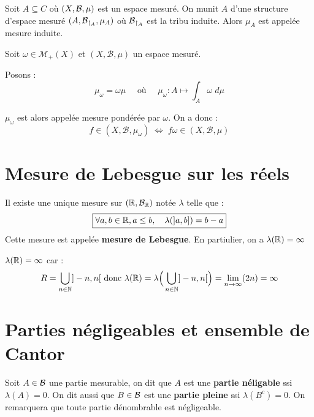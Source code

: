 \begin{definition}
    Soit $A \subseteq C$ où $(X,\mathcal{B},\mu)$ est un espace mesuré. On munit $A$ d'une structure d'espace mesuré $(A, \mathcal{B}_{\restriction _A}, \mu_A)$ où $\mathcal{B}_{\restriction _A}$ est la tribu induite.
    Alors $\mu_A$ est appelée mesure induite.
\end{definition}

\begin{definition}
    Soit $\omega \in \mathcal{M}_+(X)$ et $(X, \mathcal{B},\mu)$ un espace mesuré. 

    Posons : $$ \mu_\omega = \omega \mu \quad \text{ où } \quad \mu_\omega : A \longmapsto \int_A \omega \; d \mu $$

    $\mu_\omega$ est alors appelée mesure pondérée par $\omega$. On a donc : 
        \[ f \in (X, \mathcal{B},\mu_\omega) \; \iff \; f \omega \in (X, \mathcal{B},\mu) \] 
\end{definition}

\section{Mesure de Lebesgue sur les réels}

\begin{theorem}
    Il existe une unique mesure sur $(\mathbb{R}, \mathcal{B}_{\mathbb{R}})$ notée $\lambda$ telle que :
        \[ \boxed{ \forall a,b \in \mathbb{R}, a \leq b, \quad \lambda(]a,b]) = b-a } \] 
    Cette mesure est appelée \textbf{mesure de Lebesgue}. En partiulier, on a $ \lambda (\mathbb{R}) = \infty $ 
\end{theorem}

\begin{remark}
    $\lambda (\mathbb{R}) = \infty$ car :
        \[ R = \bigcup_{n \in \mathbb{N}} ]-n, n[ \text{ donc } \lambda (\mathbb{R}) = \lambda \Big( \bigcup_{n \in \mathbb{N}} ]-n, n[ \Big) = \lim_{n\to\infty} (2n) = \infty \] 
\end{remark}

\section{Parties négligeables et ensemble de Cantor}

\begin{definition}
    Soit $A \in \mathcal{B}$ une partie mesurable, on dit que $A$ est une \textbf{partie néligable} ssi $\lambda (A) = 0 $.
    On dit aussi que $B \in \mathcal{B}$ est une \textbf{partie pleine} ssi $\lambda(B ^c) = 0 $.  On remarquera que toute partie dénombrable est négligeable.
\end{definition}


